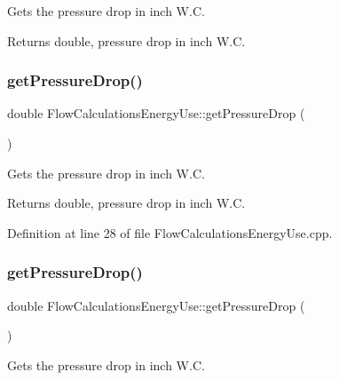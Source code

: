 Gets the pressure drop in inch W.\+C.

\begin{DoxyReturn}{Returns}
double, pressure drop in inch W.\+C. 
\end{DoxyReturn}
\mbox{\label{class_flow_calculations_energy_use_a35aa80b2b9ea8769d56bf9e8d5837927}} 
\subsubsection{\texorpdfstring{get\+Pressure\+Drop()}{getPressureDrop()}\hspace{0.1cm}{\footnotesize\ttfamily [2/3]}}
{\footnotesize\ttfamily double Flow\+Calculations\+Energy\+Use\+::get\+Pressure\+Drop (\begin{DoxyParamCaption}{ }\end{DoxyParamCaption})}

Gets the pressure drop in inch W.\+C.

\begin{DoxyReturn}{Returns}
double, pressure drop in inch W.\+C. 
\end{DoxyReturn}


Definition at line 28 of file Flow\+Calculations\+Energy\+Use.\+cpp.

\mbox{\label{class_flow_calculations_energy_use_a35aa80b2b9ea8769d56bf9e8d5837927}} 
\subsubsection{\texorpdfstring{get\+Pressure\+Drop()}{getPressureDrop()}\hspace{0.1cm}{\footnotesize\ttfamily [3/3]}}
{\footnotesize\ttfamily double Flow\+Calculations\+Energy\+Use\+::get\+Pressure\+Drop (\begin{DoxyParamCaption}{ }\end{DoxyParamCaption})}

Gets the pressure drop in inch W.\+C.

